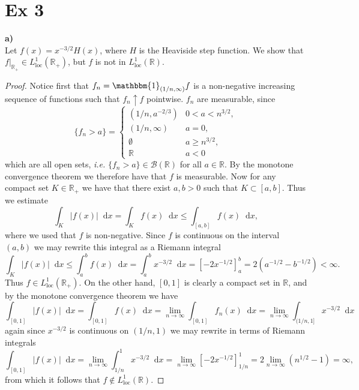 \documentclass[a4paper,11pt]{article}
\newcommand{\abs}[1]{\left\lvert #1 \right\rvert}
\newcommand*\diff{\mathop{}\!\mathrm{d}}
\newcommand{\ie}{\emph{i.e.} }
\newcommand{\R}{\mathbb{R}}
\newcommand{\loc}{\text{loc}}
\numberwithin{equation}{section}
\begin{document}
\section*{Ex 3}
\setcounter{section}{3}
\textbf{a)}\\ Let $ f(x)=x^{-3/2}H(x) $, where $ H $ is the Heaviside step function. We show that $ f\lvert_{\R_+}\in L^1_{\loc}(\R_+) $, but $ f $ is not in $ L^1_\loc(\R) $.
\begin{proof}
	Notice first that $ f_n=\mathbbm{1}_{(1/n,\infty)}f $ is a non-negative increasing sequence of functions such that $ f_n\uparrow f $ pointwise. $ f_n $ are measurable, since \begin{equation}
	\{f_n>a\}=\begin{cases}
	(1/n,a^{-2/3})& 0< a<n^{3/2},\\
	(1/n,\infty)& a=0,\\
	\emptyset& a\geq n^{3/2},\\
	\R&a< 0
	\end{cases}
	\end{equation} which are all open sets, \ie $ \{f_n>a\}\in\mathcal{B}(\R) $ for all $ a\in\R $. By the monotone convergence theorem we therefore have that  $ f $ is measurable. Now for any compact set $ K\in\R_+ $ we have that there exist $ a,b>0 $ such that $ K\subset[a,b] $. Thus we estimate \begin{equation}
	\int_K \abs{f(x)} \diff x=\int_K f(x) \diff x\leq\int_{[a,b]}f(x) \diff x,
	\end{equation}
	where we used that $ f $ is non-negative.
	Since $ f $ is continuous on the interval $ (a,b) $ we may rewrite this integral as a Riemann integral\begin{equation}
	\int_K \abs{f(x)} \diff x\leq \int_{a}^{b}f(x)\diff x=\int_{a}^{b}x^{-3/2}\diff x=\left[-2x^{-1/2}\right]_{a}^{b}=2(a^{-1/2}-b^{-1/2})<\infty.
	\end{equation}
	Thus $ f\in L^1_\loc(\R_+) $. On the other hand, $ [0,1] $ is clearly a compact set in $ \R $, and by the monotone convergence theorem we have \begin{equation}
	\int_{[0,1]}\abs{f(x)}\diff x=\int_{[0,1]}f(x)\diff x=\lim\limits_{n\to\infty}\int_{[0,1]}f_n(x)\diff x=\lim\limits_{n\to\infty}\int_{(1/n,1]}x^{-3/2}\diff x
	\end{equation}
	again since $ x^{-3/2} $ is continuous on $ (1/n,1) $ we may rewrite in terms of Riemann integrals \begin{equation}
	\int_{[0,1]}\abs{f(x)}\diff x=\lim\limits_{n\to\infty}\int_{1/n}^{1}x^{-3/2}\diff x=\lim\limits_{n\to\infty}\left[-2x^{-1/2}\right]_{1/n}^{1}=2\lim\limits_{n\to\infty}\left(n^{1/2}-1\right)=\infty,
	\end{equation}
	from which it follows that $ f\notin L^1_\loc(\R) $.
\end{proof}
\end{document}
